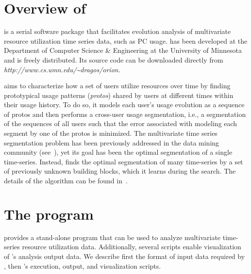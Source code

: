 \documentclass[]{article}
\begin{document}
\section{Overview of \orion}

\orion is a serial software package that facilitates evolution analysis of
multivariate resource utilization time series data, such as PC usage. \orion has
been developed at the Department of Computer Science \& Engineering at the
University of Minnesota and is freely distributed.
Its source code can be downloaded directly from {\em
http://www.cs.umn.edu/\~{}dragos/orion\/}.

\orion aims to characterize how a set of users utilize resources over time by
finding prototypical usage patterns (\emph{protos}) shared by users at different times
within their usage history. To do so, it models each user's usage evolution
as a sequence of protos and then performs a cross-user usage segmentation, i.e.,
a segmentation of the sequences of all users such that the error associated with
modeling each segment by one of the protos is minimized. The multivariate time
series segmentation problem has been previously addressed in the data mining
community (see~\cite{AbonyiFNA03, AbonyiFNA05, WangLY12, GuoLS14}), yet its goal has been
the optimal segmentation of a single time-series. Instead, \orion finds
the optimal segmentation of many time-series by a set of previously
unknown building blocks, which it learns during the search. The details of the
\orion algorithm can be found in~\cite{AnastasiuRTK15}.


\section{The \orion program}
\label{sec:usage}

\orion provides a stand-alone program that can be used to analyze multivariate
time-series resource utilization data. Additionally, several scripts enable
visualization of \orion's analysis output data. We describe first the format
of input data required by \orion, then \orion's execution, output, and
visualization scripts.

\end{document}
